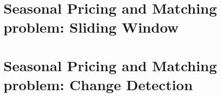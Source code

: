     \section*{Seasonal Pricing and Matching problem: Sliding Window}
    \label{sect:Seasonal Pricing and Matching problem: Sliding Window}
		
    \section*{Seasonal Pricing and Matching problem: Change Detection}
    \label{sect:Seasonal Pricing and Matching problem: Change Detection}
	
    \label{sect:References}
    \printbibliography[title={References}]
